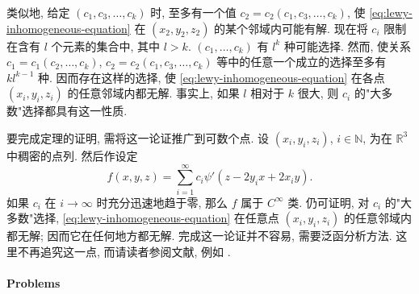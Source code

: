 类似地, 给定 $(c_1,c_3,\ldots,c_k)$ 时, 至多有一个值 $c_2=c_2(c_1,c_3,\ldots,c_k)$, 使 \eqref{eq:lewy-inhomogeneous-equation} 在 $(x_2,y_2,z_2)$ 的某个邻域内可能有解. 现在将 $c_i$ 限制在含有 $l$ 个元素的集合中, 其中 $l>k$. $(c_1,\ldots,c_k)$ 有 $l^k$ 种可能选择. 然而, 使关系 $c_1=c_1(c_2,\ldots,c_k)$, $c_2=c_2(c_1,c_3,\ldots,c_k)$ 等中的任意一个成立的选择至多有 $kl^{k-1}$ 种. 因而存在这样的选择, 使 \eqref{eq:lewy-inhomogeneous-equation} 在各点 $(x_i,y_i,z_i)$ 的任意邻域内都无解. 事实上, 如果 $l$ 相对于 $k$ 很大, 则 $c_i$ 的"大多数"选择都具有这一性质.

要完成定理的证明, 需将这一论证推广到可数个点. 设 $(x_i,y_i,z_i)$, $i\in\mathbb{N}$, 为在 $\mathbb{R}^3$ 中稠密的点列. 然后作设定
\begin{equation}\label{eq:lewy-countably-many-forcing-centres}
f(x,y,z)=\sum_{i=1}^{\infty}c_i\psi'(z-2y_ix+2x_iy).
\end{equation}
如果 $c_i$ 在 $i\to\infty$ 时充分迅速地趋于零, 那么 $f$ 属于 $C^\infty$ 类. 仍可证明, 对 $c_i$ 的"大多数"选择, \eqref{eq:lewy-inhomogeneous-equation} 在任意点 $(x_i,y_i,z_i)$ 的任意邻域内都无解; 因而它在任何地方都无解. 完成这一论证并不容易, 需要泛函分析方法. 这里不再追究这一点, 而请读者参阅文献, 例如 \cite{Jo}.

\paragraph*{Problems}

